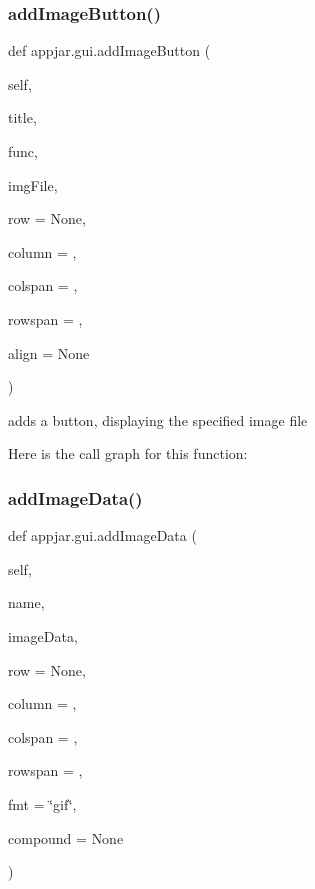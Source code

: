 \subsubsection{\texorpdfstring{add\+Image\+Button()}{addImageButton()}}
{\footnotesize\ttfamily def appjar.\+gui.\+add\+Image\+Button (\begin{DoxyParamCaption}\item[{}]{self,  }\item[{}]{title,  }\item[{}]{func,  }\item[{}]{img\+File,  }\item[{}]{row = {\ttfamily None},  }\item[{}]{column = {},  }\item[{}]{colspan = {},  }\item[{}]{rowspan = {},  }\item[{}]{align = {\ttfamily None} }\end{DoxyParamCaption})}

\begin{DoxyVerb}adds a button, displaying the specified image file \end{DoxyVerb}
 Here is the call graph for this function\+:
\mbox{\label{classappjar_1_1gui_ae403da2821d7cccce17f84c71df0b2c3}} 
\subsubsection{\texorpdfstring{add\+Image\+Data()}{addImageData()}}
{\footnotesize\ttfamily def appjar.\+gui.\+add\+Image\+Data (\begin{DoxyParamCaption}\item[{}]{self,  }\item[{}]{name,  }\item[{}]{image\+Data,  }\item[{}]{row = {\ttfamily None},  }\item[{}]{column = {},  }\item[{}]{colspan = {},  }\item[{}]{rowspan = {},  }\item[{}]{fmt = {\ttfamily \char`\"{}gif\char`\"{}},  }\item[{}]{compound = {\ttfamily None} }\end{DoxyParamCaption})}

